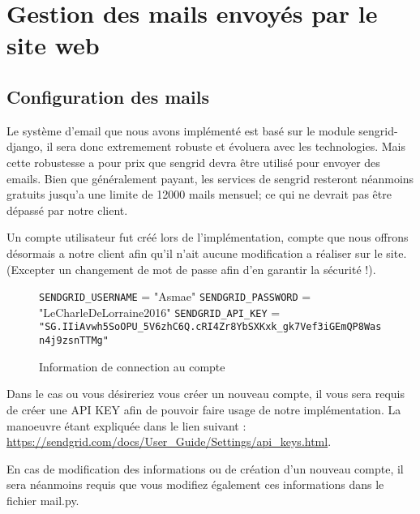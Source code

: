 \chapter{Gestion des mails envoyés par le site web}
\label{gestion des mails}

\section{Configuration des mails}

Le système d'email que nous avons implémenté est basé sur le module sengrid-django, 
il sera donc extremement robuste et évoluera avec les technologies. Mais cette
robustesse a pour prix que sengrid devra être utilisé pour envoyer des emails.
Bien que généralement payant, les services de sengrid resteront néanmoins gratuits 
jusqu'a une limite de 12000 mails mensuel; ce qui ne devrait pas être dépassé
par notre client. \newline

Un compte utilisateur fut créé lors de l'implémentation, compte que nous offrons désormais
a notre client afin qu'il n'ait aucune modification a réaliser sur le site.(Excepter un changement de mot de passe afin d'en garantir la sécurité !).  \newline

\begin{figure}[!ht]
	\begin{framed}
\verb|SENDGRID_USERNAME| = "Asmae" \newline
\verb|SENDGRID_PASSWORD| = "LeCharleDeLorraine2016" \newline
\verb|SENDGRID_API_KEY| = \newline \verb|"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"|
	\end{framed}
	\caption{Information de connection au compte}
	\label{fig:Architecture des dossiers}
\end{figure}
\FloatBarrier

Dans le cas ou vous désireriez vous créer un nouveau compte, il vous sera requis de 
créer une API KEY afin de pouvoir faire usage de notre implémentation. La manoeuvre 
étant expliquée dans le lien suivant : 
\url{https://sendgrid.com/docs/User_Guide/Settings/api_keys.html}. \newline

En cas de modification des informations ou de création d'un nouveau compte, il sera
néanmoins requis que vous modifiez également ces informations dans le fichier mail.py.

